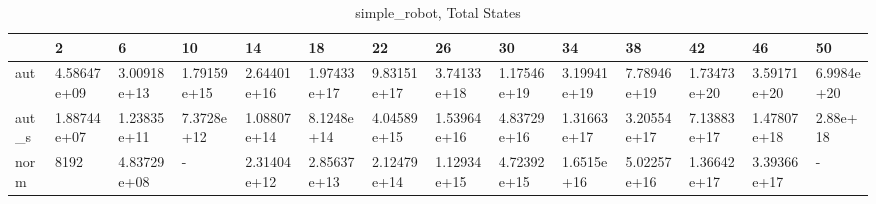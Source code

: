 \begin{table}
\caption{simple_robot, Total States}
\label{simple_robot_total}
\begin{tabular}{llllllllllllll}
\toprule
 & 2 & 6 & 10 & 14 & 18 & 22 & 26 & 30 & 34 & 38 & 42 & 46 & 50 \\
\midrule
aut & 4.58647e+09 & 3.00918e+13 & 1.79159e+15 & 2.64401e+16 & 1.97433e+17 & 9.83151e+17 & 3.74133e+18 & 1.17546e+19 & 3.19941e+19 & 7.78946e+19 & 1.73473e+20 & 3.59171e+20 & 6.9984e+20 \\
aut_s & 1.88744e+07 & 1.23835e+11 & 7.3728e+12 & 1.08807e+14 & 8.1248e+14 & 4.04589e+15 & 1.53964e+16 & 4.83729e+16 & 1.31663e+17 & 3.20554e+17 & 7.13883e+17 & 1.47807e+18 & 2.88e+18 \\
norm & 8192 & 4.83729e+08 & - & 2.31404e+12 & 2.85637e+13 & 2.12479e+14 & 1.12934e+15 & 4.72392e+15 & 1.6515e+16 & 5.02257e+16 & 1.36642e+17 & 3.39366e+17 & - \\
\bottomrule
\end{tabular}
\end{table}
